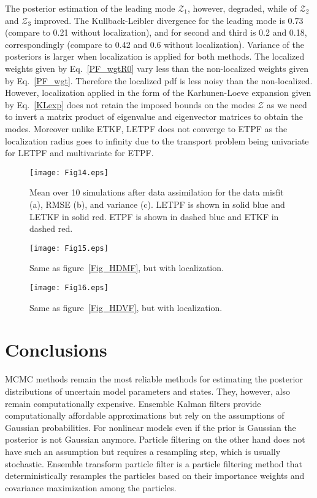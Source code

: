 \documentclass[12, a4paper]{article}
\numberwithin{equation}{section}
\begin{document}
The posterior estimation of the leading mode $\mathcal{Z}_1$, however, degraded, while of $\mathcal{Z}_2$ and $\mathcal{Z}_3$ improved. 
The Kullback-Leibler divergence for the leading mode is 0.73 (compare to 0.21 without localization), and for second and third is 0.2 and 0.18, 
correspondingly (compare to 0.42 and 0.6 without localization). Variance of the posteriors is larger when localization is applied for both methods. 
The localized weights given by Eq.~\eqref{PF_wgtR0} vary less than the non-localized weights given by Eq.~\eqref{PF_wgt}. 
Therefore the localized pdf is less noisy than the non-localized. 
However, localization applied in the form of the Karhunen-Loeve expansion given by Eq.~\eqref{KLexp} does not retain the imposed bounds on the modes $\mathcal{Z}$ 
as we need to invert a matrix product of eigenvalue and eigenvector matrices to obtain the modes. 
Moreover unlike ETKF, LETPF does not converge to ETPF as the localization radius 
goes to infinity due to the transport problem being univariate for LETPF and multivariate for ETPF. 

\begin{figure} [t]
	\centering		
	\texttt{[image: Fig14.eps]}	
	\caption{Mean over 10 simulations after data assimilation for the data misfit (a), RMSE (b), and variance (c). 
		LETPF is shown in solid blue and LETKF in solid red.
		ETPF is shown in dashed blue and ETKF in dashed red.}	
	\label{Fig_HDLocerr}
\end{figure}  
\begin{figure} [t]
	\centering		
	\texttt{[image: Fig15.eps]}	
	\caption{Same as figure~\ref{Fig_HDMF}, but with localization.}	
	\label{Fig_HDLocMF}
\end{figure}  
\begin{figure} [ht]
	\centering		
	\texttt{[image: Fig16.eps]}	
	\caption{Same as figure~\ref{Fig_HDVF}, but with localization.}	
	\label{Fig_HDLocVF}
\end{figure}  

\section{Conclusions} \label{Sec:Con}  %
MCMC methods remain the most reliable methods for estimating the posterior distributions of uncertain model parameters and states. They, however, also remain computationally expensive. Ensemble Kalman filters provide computationally affordable approximations but rely on the assumptions of Gaussian probabilities. For nonlinear models even if the prior is Gaussian the posterior is not Gaussian anymore. Particle filtering on the other hand does not have such an assumption but requires a resampling step, which is usually stochastic. 
Ensemble transform particle filter is a particle filtering method that deterministically resamples the particles based on their importance weights and covariance maximization among the particles.
\end{document}
